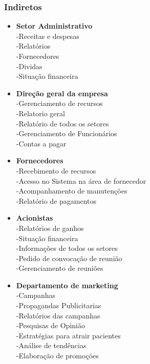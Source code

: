 \subsubsection{ Indiretos}

\begin{itemize}
      \item \textbf{Setor Administrativo}\\
            -Receitas e despesas\\
            -Relatórios\\
            -Fornecedores\\
            -Dividas\\
            -Situação financeira\\


      \item \textbf{Direção geral da empresa}\\
            -Gerenciamento de recursos\\
            -Relatorio geral\\
            -Relatório de todos os setores\\
            -Gerenciamento de Funcionários\\
            -Contas a pagar\\


      \item \textbf{Fornecedores}\\
            -Recebimento de recursos\\
            -Acesso no Sistema na área de fornecedor\\
            -Acompanhamento de manutenções\\
            -Relatório de pagamentos\\





      \item \textbf{Acionistas}\\
            -Relatórios de ganhos\\
            -Situação financeira\\
            -Informações de todos os setores\\
            -Pedido de convocação de reunião\\
            -Gerenciamento de reuniões\\



      \item \textbf{Departamento de marketing}\\
            -Campanhas\\
            -Propagandas Publicitarias\\
            -Relatórios das campanhas\\
            -Pesquisas de Opinião\\
            -Estratégias para atrair pacientes\\
            -Análise de tendências\\
            -Elaboração de promoções\\
\end{itemize}



